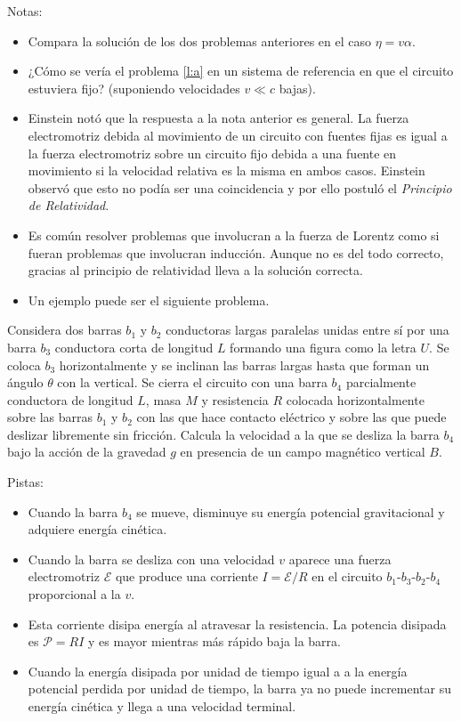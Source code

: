 \documentclass{exam}
\begin{document}
\begin{questions}
  Notas:
  \begin{itemize}
  \item Compara la solución de los dos problemas anteriores en el caso
    $\eta=v\alpha$.
  \item ¿Cómo se vería el problema \ref{l:a} en un sistema de
    referencia en que el circuito estuviera fijo? (suponiendo
    velocidades $v\ll c$ bajas).
  \item Einstein notó que la respuesta a la nota anterior es general. La fuerza
    electromotriz debida al movimiento de un circuito con fuentes
    fijas es igual a la fuerza electromotriz sobre un circuito fijo
    debida a una fuente en movimiento si la velocidad relativa es la
    misma en ambos casos. Einstein observó que esto no
    podía ser una coincidencia y por ello postuló el {\em Principio de
      Relatividad}.
  \item Es común resolver problemas que involucran a la fuerza de
    Lorentz como si fueran problemas que involucran inducción. Aunque
    no es del todo correcto, gracias al principio de
    relatividad lleva a la solución correcta.
  \item Un ejemplo puede ser el siguiente problema.
  \end{itemize}

  \question Considera dos barras $b_1$ y $b_2$ conductoras largas paralelas
  unidas entre sí por una barra $b_3$ conductora corta de longitud $L$
  formando una figura como la letra $U$. Se coloca $b_3$
  horizontalmente y se inclinan las barras largas hasta que forman un
  ángulo $\theta$ con la vertical. Se cierra el circuito
  con una barra $b_4$ parcialmente conductora de longitud $L$, masa $M$ y
  resistencia $R$ colocada horizontalmente sobre las barras $b_1$ y
  $b_2$ con las que hace contacto eléctrico y sobre las que puede deslizar
  libremente sin fricción. Calcula la velocidad a la que se desliza la barra $b_4$
  bajo la acción de la gravedad $g$ en presencia de un campo magnético
  vertical $B$.

  Pistas:
  \begin{itemize}
  \item Cuando la barra $b_4$ se mueve, disminuye su energía potencial
    gravitacional y adquiere energía cinética.
  \item Cuando la barra se desliza con una velocidad $v$ aparece una fuerza electromotriz
    $\mathcal E$ que produce una corriente $I=\mathcal E/R$ en el
    circuito $b_1$-$b_3$-$b_2$-$b_4$ proporcional a la $v$.
  \item  Esta corriente disipa energía al atravesar la resistencia. La
    potencia disipada es $\mathcal P=RI$ y es mayor mientras más
    rápido baja la barra.
  \item Cuando la energía disipada por unidad de tiempo igual a a la
    energía potencial perdida por unidad de tiempo, la barra ya no
    puede incrementar su energía cinética y llega a una velocidad
    terminal.
  \end{itemize}


\end{questions}
\end{document}
